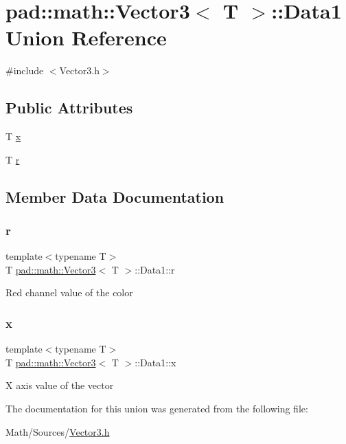 \hypertarget{unionpad_1_1math_1_1_vector3_1_1_data1}{}\section{pad\+:\+:math\+:\+:Vector3$<$ T $>$\+:\+:Data1 Union Reference}
\label{unionpad_1_1math_1_1_vector3_1_1_data1}


{\ttfamily \#include $<$Vector3.\+h$>$}

\subsection*{Public Attributes}
\begin{DoxyCompactItemize}
\item 
T \mbox{\hyperlink{unionpad_1_1math_1_1_vector3_1_1_data1_aeb9440a567518cd4e15a51fa47a9626d}{x}}
\item 
T \mbox{\hyperlink{unionpad_1_1math_1_1_vector3_1_1_data1_ad503a970cec4fcab0ddd9169af1bc832}{r}}
\end{DoxyCompactItemize}


\subsection{Member Data Documentation}
\mbox{\label{unionpad_1_1math_1_1_vector3_1_1_data1_ad503a970cec4fcab0ddd9169af1bc832}} 
\subsubsection{\texorpdfstring{r}{r}}
{\footnotesize\ttfamily template$<$typename T$>$ \\
T \mbox{\hyperlink{structpad_1_1math_1_1_vector3}{pad\+::math\+::\+Vector3}}$<$ T $>$\+::Data1\+::r}

Red channel value of the color \mbox{\label{unionpad_1_1math_1_1_vector3_1_1_data1_aeb9440a567518cd4e15a51fa47a9626d}} 
\subsubsection{\texorpdfstring{x}{x}}
{\footnotesize\ttfamily template$<$typename T$>$ \\
T \mbox{\hyperlink{structpad_1_1math_1_1_vector3}{pad\+::math\+::\+Vector3}}$<$ T $>$\+::Data1\+::x}

X axis value of the vector 

The documentation for this union was generated from the following file\+:\begin{DoxyCompactItemize}
\item 
Math/\+Sources/\mbox{\hyperlink{_vector3_8h}{Vector3.\+h}}\end{DoxyCompactItemize}
